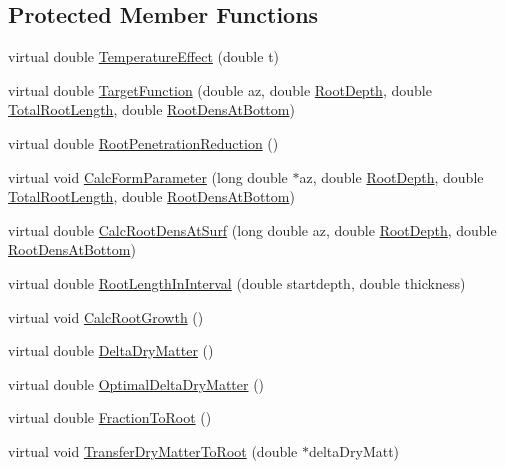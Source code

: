 \subsection*{Protected Member Functions}
\begin{DoxyCompactItemize}
\item 
virtual double \hyperlink{classcrop_af01aa0fd15613a9e2fcb2a23ca089d5f}{TemperatureEffect} (double t)
\item 
virtual double \hyperlink{classcrop_abfdb2b5e795f4843b14de933386afac9}{TargetFunction} (double az, double \hyperlink{classcrop_aefe9049cee98b6ac81f4362c4a1190a9}{RootDepth}, double \hyperlink{classcrop_a1f0aa4443cf11cdf5776454bd056fa28}{TotalRootLength}, double \hyperlink{classcrop_a3bd248dac15a2aefd7289240ffeeb879}{RootDensAtBottom})
\item 
virtual double \hyperlink{classcrop_a06cb6f783d002e20c7e19938b30dca54}{RootPenetrationReduction} ()
\item 
virtual void \hyperlink{classcrop_a9a07463f05737a8a8e118263e79feccc}{CalcFormParameter} (long double $\ast$az, double \hyperlink{classcrop_aefe9049cee98b6ac81f4362c4a1190a9}{RootDepth}, double \hyperlink{classcrop_a1f0aa4443cf11cdf5776454bd056fa28}{TotalRootLength}, double \hyperlink{classcrop_a3bd248dac15a2aefd7289240ffeeb879}{RootDensAtBottom})
\item 
virtual double \hyperlink{classcrop_a50355c2424f5c5f1a7bfc1b8f91c500f}{CalcRootDensAtSurf} (long double az, double \hyperlink{classcrop_aefe9049cee98b6ac81f4362c4a1190a9}{RootDepth}, double \hyperlink{classcrop_a3bd248dac15a2aefd7289240ffeeb879}{RootDensAtBottom})
\item 
virtual double \hyperlink{classcrop_a72e68283aa65578e991092da749c6f44}{RootLengthInInterval} (double startdepth, double thickness)
\item 
virtual void \hyperlink{classcrop_a022c14d2c183c8d21c622c225bb763d8}{CalcRootGrowth} ()
\item 
virtual double \hyperlink{classcrop_a2dbc56666f949042e5d0c80dbbd66325}{DeltaDryMatter} ()
\item 
virtual double \hyperlink{classcrop_a453298213a2fe4470677235a81e6d62a}{OptimalDeltaDryMatter} ()
\item 
virtual double \hyperlink{classcrop_a210e5515e11a5b705e0d3cd99a12e581}{FractionToRoot} ()
\item 
virtual void \hyperlink{classcrop_aeb0993f2a6d2f21d30a5c24bbd46833e}{TransferDryMatterToRoot} (double $\ast$deltaDryMatt)
\item 

\end{DoxyCompactItemize}
